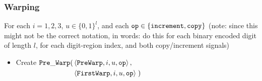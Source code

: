\subsubsection{ Warping }

    For each $i = 1, 2, 3$, $u \in \{0, 1\}^l$, and each ${\tt op} \in \{ {\tt increment, copy } \}$
    (note: since this might not be the correct notation, in words: do this for each binary encoded digit of length $l$,
    for each digit-region index, and both copy/increment signals)



    \begin{itemize}

        \item Create
        $\begin{aligned}[t]
            {\tt Pre\_Warp}(& \left\langle {\tt PreWarp},   i, u, {\tt op} \right\rangle, \\
                     & \left\langle {\tt FirstWarp}, i, u, {\tt op} \right\rangle \;)
        \end{aligned}$
        \vspace{.5cm}




\end{itemize}
